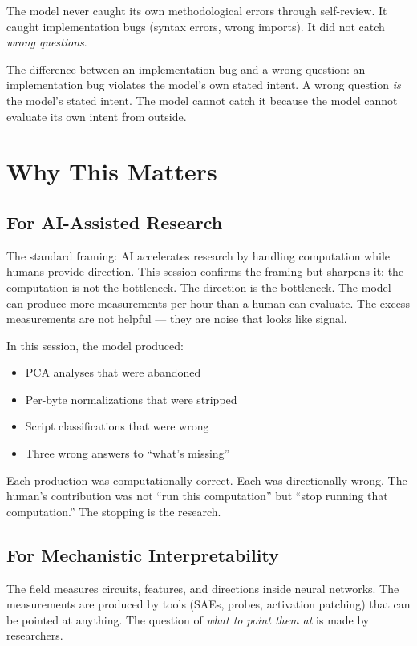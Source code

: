\documentclass[11pt,a4paper]{article}
\begin{document}
The model never caught its own methodological errors through self-review. It caught implementation bugs (syntax errors, wrong imports). It did not catch \textit{wrong questions}.

The difference between an implementation bug and a wrong question: an implementation bug violates the model's own stated intent. A wrong question \textit{is} the model's stated intent. The model cannot catch it because the model cannot evaluate its own intent from outside.

\section{Why This Matters}

\subsection{For AI-Assisted Research}

The standard framing: AI accelerates research by handling computation while humans provide direction. This session confirms the framing but sharpens it: the computation is not the bottleneck. The direction is the bottleneck. The model can produce more measurements per hour than a human can evaluate. The excess measurements are not helpful --- they are noise that looks like signal.

In this session, the model produced:
\begin{itemize}[nosep]
\item PCA analyses that were abandoned
\item Per-byte normalizations that were stripped
\item Script classifications that were wrong
\item Three wrong answers to ``what's missing''
\end{itemize}

Each production was computationally correct. Each was directionally wrong. The human's contribution was not ``run this computation'' but ``stop running that computation.'' The stopping is the research.

\subsection{For Mechanistic Interpretability}

The field measures circuits, features, and directions inside neural networks. The measurements are produced by tools (SAEs, probes, activation patching) that can be pointed at anything. The question of \textit{what to point them at} is made by researchers.
\end{document}
